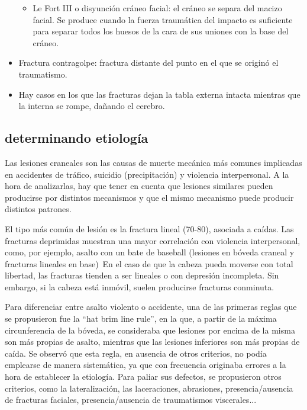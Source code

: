 \begin{itemize}
\begin{itemize}
		\item Le Fort III o disyunción cráneo facial: el cráneo se separa del macizo facial. Se produce cuando la fuerza traumática del impacto es suficiente para separar todos los huesos de la cara de sus uniones con la base del cráneo.
	\end{itemize}
	\item Fractura contragolpe: fractura distante del punto en el que se originó el traumatismo. 
	\item Hay casos en los que las fracturas dejan la tabla externa intacta mientras que la interna se rompe, dañando el cerebro. 
\end{itemize}
\subsection{determinando etiología}
Las lesiones craneales son las causas de muerte mecánica más comunes implicadas en accidentes de tráfico, suicidio (precipitación) y violencia interpersonal. A la hora de analizarlas, hay que tener en cuenta que lesiones similares pueden producirse por distintos mecanismos y que el mismo mecanismo puede producir distintos patrones.
 
El tipo más común de lesión es la fractura lineal (70-80), asociada a caídas. Las fracturas deprimidas muestran una mayor correlación con violencia interpersonal, como, por ejemplo, asalto con un bate de baseball (lesiones en bóveda craneal y fracturas lineales en base)\
En el caso de que la cabeza pueda moverse con total libertad, las fracturas tienden a ser lineales o con depresión incompleta. Sin embargo, si la cabeza está inmóvil, suelen producirse fracturas conminuta.

Para diferenciar entre asalto violento o accidente, una de las primeras reglas que se propusieron fue la “hat brim line rule”, en la que, a partir de la máxima circunferencia de la bóveda, se consideraba que lesiones por encima de la misma son más propias de asalto, mientras que las lesiones inferiores son más propias de caída. Se observó que esta regla, en ausencia de otros criterios, no podía emplearse de manera sistemática, ya que con frecuencia originaba errores a la hora de establecer la etiología. Para paliar sus defectos, se propusieron otros criterios, como la lateralización, las laceraciones, abrasiones, presencia/ausencia de fracturas faciales, presencia/ausencia de traumatismos viscerales...

